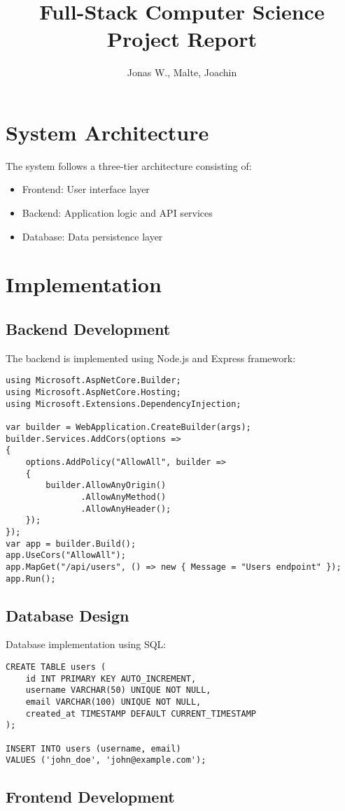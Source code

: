 \documentclass[12pt,a4paper]{article}
\title{Full-Stack Computer Science Project Report}
\author{Jonas W., Malte, Joachin}
\begin{document}
\maketitle

\newpage

\tableofcontents
\newpage

\section{System Architecture}
The system follows a three-tier architecture consisting of:
\begin{itemize}
\item Frontend: User interface layer
\item Backend: Application logic and API services  
\item Database: Data persistence layer
\end{itemize}

\section{Implementation}

\subsection{Backend Development}
The backend is implemented using Node.js and Express framework:

\begin{verbatim}
using Microsoft.AspNetCore.Builder;
using Microsoft.AspNetCore.Hosting;
using Microsoft.Extensions.DependencyInjection;

var builder = WebApplication.CreateBuilder(args);
builder.Services.AddCors(options =>
{
    options.AddPolicy("AllowAll", builder =>
    {
        builder.AllowAnyOrigin()
               .AllowAnyMethod()
               .AllowAnyHeader();
    });
});
var app = builder.Build();
app.UseCors("AllowAll");
app.MapGet("/api/users", () => new { Message = "Users endpoint" });
app.Run();
\end{verbatim}

\subsection{Database Design}
Database implementation using SQL:

\begin{verbatim}
CREATE TABLE users (
    id INT PRIMARY KEY AUTO_INCREMENT,
    username VARCHAR(50) UNIQUE NOT NULL,
    email VARCHAR(100) UNIQUE NOT NULL,
    created_at TIMESTAMP DEFAULT CURRENT_TIMESTAMP
);

INSERT INTO users (username, email) 
VALUES ('john_doe', 'john@example.com');
\end{verbatim}

\subsection{Frontend Development}

\appendix
\end{document}
